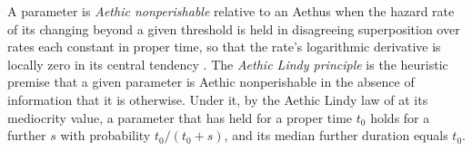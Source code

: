 
\begin{definition}
\label{gr1:def:aethiclindy}
A parameter is \emph{Aethic nonperishable} relative to an Aethus when the
hazard rate of its changing beyond a given threshold is held in disagreeing
superposition over rates each constant in proper time, so that the rate's
logarithmic derivative is locally zero in its central tendency
\cite{Aethus}. The \emph{Aethic Lindy principle} is the heuristic premise
that a given parameter is Aethic nonperishable in the absence of
information that it is otherwise. Under it, by the Aethic Lindy law of
\cite{Aethus} at its mediocrity value, a parameter that has held for a
proper time $t_0$ holds for a further $s$ with probability $t_0/(t_0+s)$,
and its median further duration equals $t_0$.
\end{definition}

